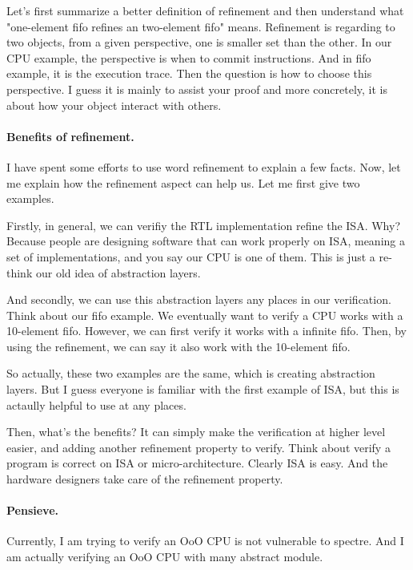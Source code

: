 \documentclass{article}
\begin{document}
Let's first summarize a better definition of refinement and then understand what "one-element fifo refines an two-element fifo" means.
Refinement is regarding to two objects, from a given perspective, one is smaller set than the other.
In our CPU example, the perspective is when to commit instructions.
And in fifo example, it is the execution trace.
Then the question is how to choose this perspective.
I guess it is mainly to assist your proof and more concretely, it is about how your object interact with others.




\paragraph{Benefits of refinement.}
I have spent some efforts to use word refinement to explain a few facts.
Now, let me explain how the refinement aspect can help us.
Let me first give two examples.

Firstly, in general, we can verifiy the RTL implementation refine the ISA.
Why? Because people are designing software that can work properly on ISA, meaning a set of implementations, and you say our CPU is one of them.
This is just a re-think our old idea of abstraction layers.

And secondly, we can use this abstraction layers any places in our verification.
Think about our fifo example.
We eventually want to verify a CPU works with a 10-element fifo.
However, we can first verify it works with a infinite fifo.
Then, by using the refinement, we can say it also work with the 10-element fifo.

So actually, these two examples are the same, which is creating abstraction layers.
But I guess everyone is familiar with the first example of ISA, but this is actaully helpful to use at any places.

Then, what's the benefits?
It can simply make the verification at higher level easier, and adding another refinement property to verify.
Think about verify a program is correct on ISA or micro-architecture.
Clearly ISA is easy.
And the hardware designers take care of the refinement property.




\paragraph{Pensieve.}
Currently, I am trying to verify an OoO CPU is not vulnerable to spectre.
And I am actually verifying an OoO CPU with many abstract module.
\end{document}
